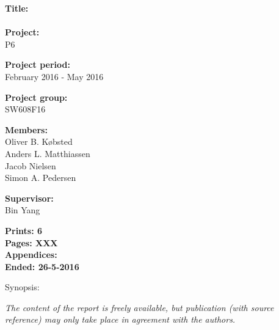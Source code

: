 \begin{minipage}[t]{0.48\textwidth}
\textbf{Title:} \\[5pt]\bigskip\hspace{2ex}    
\name\\
\textbf{Project:} \\[5pt]\bigskip\hspace{2ex}
P6

\textbf{Project period:} \\[5pt]\bigskip\hspace{2ex}
February 2016 - May 2016

\textbf{Project group:} \\[5pt]\bigskip\hspace{2ex}
SW608F16

\textbf{Members:} \\[5pt]\hspace*{2ex}
Oliver B. Købsted \\\hspace*{2ex}
Anders L. Matthiassen \\\hspace*{2ex}
Jacob Nielsen \\\hspace*{2ex}
Simon A. Pedersen \\\hspace*{2ex}


\textbf{Supervisor:} \\[5pt]\hspace*{2ex}
Bin Yang


\vspace*{1cm}

\textbf{Prints: 6} \\
\textbf{Pages: XXX} \\
\textbf{Appendices: } \\
\textbf{Ended: 26-5-2016}

\end{minipage}
\hfill
\begin{minipage}[t]{0.483\textwidth}
Synopsis: \\[5pt]
\fbox{\parbox{7cm}{\bigskip\bigskip}}
\end{minipage}

\vfill

{\footnotesize\itshape The content of the report is freely available, but publication (with source reference) may only take place in agreement with the authors.}

